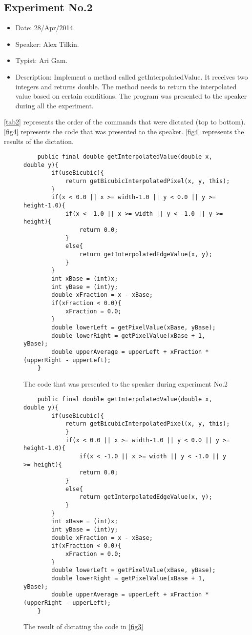 \subsection{Experiment No.2}
\begin{itemize}
	\item Date: 28/Apr/2014.
	\item Speaker: Alex Tilkin.
	\item Typist: Ari Gam.
	\item Description: Implement a method called getInterpolatedValue. It receives two integers and returns double. The method needs to return the interpolated value based on certain conditions. The program was presented to the speaker during all the experiment.
\end{itemize}
\autoref{tab2} represents the order of the commands that were dictated (top to bottom). \autoref{fig4} represents the code that was presented to the speaker. \autoref{fig4} represents the results of the dictation.
\begin{figure}[H]
	\begin{lstlisting}
	public final double getInterpolatedValue(double x, double y){
		if(useBicubic){
			return getBicubicInterpolatedPixel(x, y, this);
		}
		if(x < 0.0 || x >= width-1.0 || y < 0.0 || y >= height-1.0){
			if(x < -1.0 || x >= width || y < -1.0 || y >= height){
				return 0.0;
			}
			else{
				return getInterpolatedEdgeValue(x, y);
			}
		}
		int xBase = (int)x;
		int yBase = (int)y;
		double xFraction = x - xBase;
		if(xFraction < 0.0){
			xFraction = 0.0;
		}
		double lowerLeft = getPixelValue(xBase, yBase);
		double lowerRight = getPixelValue(xBase + 1, yBase);
		double upperAverage = upperLeft + xFraction * (upperRight - upperLeft);
	}
	\end{lstlisting}
	\caption{The code that was presented to the speaker during experiment No.2}
	\label{fig4}
\end{figure}
\begin{figure}[H]
	\begin{lstlisting}
	public final double getInterpolatedValue(double x, double y){
		if(useBicubic){
			return getBicubicInterpolatedPixel(x, y, this);
			}
			if(x < 0.0 || x >= width-1.0 || y < 0.0 || y >= height-1.0){
				if(x < -1.0 || x >= width || y < -1.0 || y >= height){
				return 0.0;
			}
			else{
				return getInterpolatedEdgeValue(x, y);
			}
		}
		int xBase = (int)x;
		int yBase = (int)y;
		double xFraction = x - xBase;
		if(xFraction < 0.0){
			xFraction = 0.0;
		}
		double lowerLeft = getPixelValue(xBase, yBase);
		double lowerRight = getPixelValue(xBase + 1, yBase);
		double upperAverage = upperLeft + xFraction * (upperRight - upperLeft);
	}
	\end{lstlisting}
	\caption{The result of dictating the code in \autoref{fig3}}
	\label{fig4}
\end{figure}
